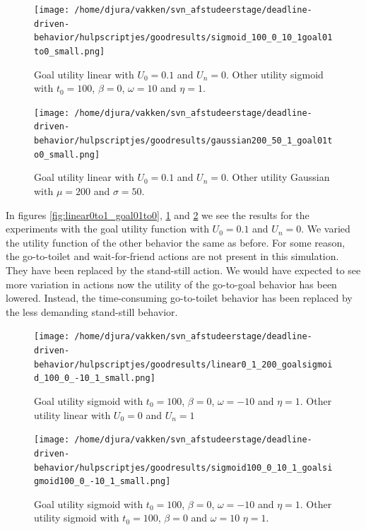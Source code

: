 \documentclass[11pt, a4paper]{book}
\begin{document}
\begin{figure}[h!]
\centering
\texttt{[image: /home/djura/vakken/svn\_afstudeerstage/deadline-driven-behavior/hulpscriptjes/goodresults/sigmoid\_100\_0\_10\_1goal01to0\_small.png]}
\caption{Goal utility linear with $U_0=0.1$ and $U_n=0$. Other utility sigmoid with $t_0=100$, $\beta=0$, $\omega=10$ and $\eta=1$.}
\label{fig:sigmoid_100_0_10_1goal01to0}
\end{figure}

\begin{figure}[h!]
\centering
\texttt{[image: /home/djura/vakken/svn\_afstudeerstage/deadline-driven-behavior/hulpscriptjes/goodresults/gaussian200\_50\_1\_goal01to0\_small.png]}
\caption{Goal utility linear with $U_0=0.1$ and $U_n=0$. Other utility Gaussian with $\mu=200$ and $\sigma=50$.}
\label{fig:gaussian200_50_1_goal01to0}
\end{figure}

In figures \ref{fig:linear0to1_goal01to0}, \ref{fig:sigmoid_100_0_10_1goal01to0} and \ref{fig:gaussian200_50_1_goal01to0} we see the results for the experiments with the goal utility function with $U_0=0.1$ and $U_n=0$. We varied the utility function of the other behavior the same as before. For some reason, the go-to-toilet and wait-for-friend actions are not present in this simulation. They have been replaced by the stand-still action. We would have expected to see more variation in actions now the utility of the go-to-goal behavior has been lowered. Instead, the time-consuming go-to-toilet behavior has been replaced by the less demanding stand-still behavior.

\begin{figure}[h!]
\centering
\texttt{[image: /home/djura/vakken/svn\_afstudeerstage/deadline-driven-behavior/hulpscriptjes/goodresults/linear0\_1\_200\_goalsigmoid\_100\_0\_-10\_1\_small.png]}
\caption{Goal utility sigmoid with $t_0=100$, $\beta=0$, $\omega=-10$ and $\eta=1$. Other utility linear with $U_0=0$ and $U_n=1$}
\label{fig:linear0_1_200_goalsigmoid_100_0_-10_1}
\end{figure}


\begin{figure}[h!]
\centering
\texttt{[image: /home/djura/vakken/svn\_afstudeerstage/deadline-driven-behavior/hulpscriptjes/goodresults/sigmoid100\_0\_10\_1\_goalsigmoid100\_0\_-10\_1\_small.png]}
\caption{Goal utility sigmoid with $t_0=100$, $\beta=0$, $\omega=-10$ and $\eta=1$. Other utility sigmoid with $t_0=100$, $\beta=0$ and $\omega=10$ $\eta=1$.}
\label{fig:sigmoid100_0_10_1_goalsigmoid100_0_-10_1}
\end{figure}
\end{document}
